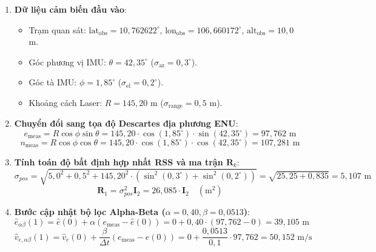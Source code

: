\begin{enumerate}
    \item \textbf{Dữ liệu cảm biến đầu vào}:
    \begin{itemize}
        \item Trạm quan sát: $\text{lat}_{\text{obs}} = 10{,}762622^\circ$, $\text{lon}_{\text{obs}} = 106{,}660172^\circ$, $\text{alt}_{\text{obs}} = 10{,}0$ m.
        \item Góc phương vị IMU: $\theta = 42{,}35^\circ$ ($\sigma_{\text{az}} = 0{,}3^\circ$).
        \item Góc tà IMU: $\phi = 1{,}85^\circ$ ($\sigma_{\text{el}} = 0{,}2^\circ$).
        \item Khoảng cách Laser: $R = 145{,}20$ m ($\sigma_{\text{range}} = 0{,}5$ m).
    \end{itemize}

    \item \textbf{Chuyển đổi sang tọa độ Descartes địa phương ENU}:
    \begin{equation}
    e_{\text{meas}} = R \cos\phi \sin\theta = 145{,}20 \cdot \cos(1{,}85^\circ) \cdot \sin(42{,}35^\circ) = 97{,}762 \text{ m}
    \end{equation}
    \begin{equation}
    n_{\text{meas}} = R \cos\phi \cos\theta = 145{,}20 \cdot \cos(1{,}85^\circ) \cdot \cos(42{,}35^\circ) = 107{,}281 \text{ m}
    \end{equation}

    \item \textbf{Tính toán độ bất định hợp nhất RSS và ma trận $\mathbf{R}_k$}:
    \begin{equation}
    \sigma_{pos} = \sqrt{5{,}0^2 + 0{,}5^2 + 145{,}20^2 \cdot \left(\sin^2(0{,}3^\circ) + \sin^2(0{,}2^\circ)\right)} = \sqrt{25{,}25 + 0{,}835} = 5{,}107 \text{ m}
    \end{equation}
    \begin{equation}
    \mathbf{R}_1 = \sigma_{pos}^2 \mathbf{I}_2 = 26{,}085 \cdot \mathbf{I}_2 \quad (\text{m}^2)
    \end{equation}

    \item \textbf{Bước cập nhật bộ lọc Alpha-Beta ($\alpha = 0{,}40, \beta = 0{,}0513$)}:
    \begin{equation}
    \hat{e}_{\alpha\beta}(1) = \hat{e}(0) + \alpha (e_{\text{meas}} - \hat{e}(0)) = 0 + 0{,}40 \cdot (97{,}762 - 0) = 39{,}105 \text{ m}
    \end{equation}
    \begin{equation}
    \hat{v}_{e, \alpha\beta}(1) = \hat{v}_e(0) + \frac{\beta}{\Delta t} (e_{\text{meas}} - \hat{e}(0)) = 0 + \frac{0{,}0513}{0{,}1} \cdot 97{,}762 = 50{,}152 \text{ m/s}
    \end{equation}


\end{enumerate}
